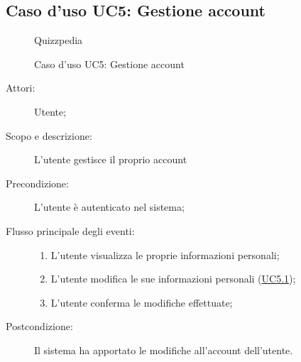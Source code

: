 \subsection{Caso d'uso UC5: Gestione account}
        \begin{figure}[H]
            \centering
            \begin{resizedtikzpicture}{\textwidth}
		\begin{umlsystem}[x=0, fill=lightgray!20]{Quizzpedia}
		\end{umlsystem}
            \end{resizedtikzpicture}
            \caption{Caso d'uso UC5: Gestione account}
            \label{fig:UC5} 
        \end{figure}
    \begin{description}
\item[Attori:] Utente;
\item[Scopo e descrizione:] L'utente gestisce il proprio account
      \item[Precondizione:] L'utente è autenticato nel sistema;

        \item[Flusso principale degli eventi:] \begin{enumerate}
          \item L’utente visualizza le proprie informazioni personali;
          \item L'utente modifica le sue informazioni personali (\hyperlink{UC5.1}{UC5.1});
          \item L'utente conferma le modifiche effettuate;

      \end{enumerate}
    \item[Postcondizione:] Il sistema ha apportato le modifiche all'account dell'utente.
  \end{description}
\hypertarget{UC5.1}{}

